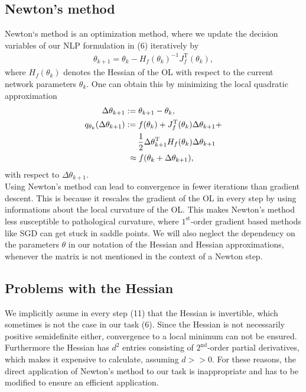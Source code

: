\documentclass[conference]{IEEEtran}
\begin{document}
	\subsection{Newton's method}
	\noindent
	Newton`s method is an optimization method, where we update the decision variables of our NLP formulation in (6) iteratively by
	\begin{align}
	\theta_{k+1} = \theta_{k} -H_{f}(\theta_{k})^{-1} J_{f}^{\mathrm{T}}(\theta_{k}),
	\end{align}
	where $H_{f}(\theta_{k})$ denotes the Hessian of the OL with respect to the current network parameters $\theta_{k}$. One can obtain this by minimizing the local quadratic approximation
	\begin{align}
	\text{ }\Delta\theta_{k+1} &:= \theta_{k+1} - \theta_{k},\\
	q_{\theta_{k}}(\Delta\theta_{k+1})&:= f(\theta_{k}) + J_{f}^{\mathrm{T}}(\theta_{k})\Delta\theta_{k+1} + \notag\\  
	&\:\:\:\:\:\:\:\frac{1}{2}\Delta\theta_{k+1}^{\mathrm{T}}H_{f}(\theta_{k})\Delta\theta_{k+1}\\
	&\text{ }\approx f(\theta_{k} + \Delta\theta_{k+1}),
	\end{align}
	with respect to $\Delta\theta_{k+1}$. \\
	Using Newton's method can lead to convergence in fewer iterations than gradient descent. This is because it rescales the gradient of the OL in every step by using informations about the local curvature of the OL. This makes Newton's method less susceptible to pathological curvature, where $1^{\text{st}}$-order gradient based methods like SGD can get stuck in saddle points. We will also neglect the dependency on the parameters $\theta$ in our notation of the Hessian and Hessian approximations, whenever the matrix is not mentioned in the context of a Newton step.
	
	
	\subsection{Problems with the Hessian}
	\noindent
	We implicitly asume in every step (11) that the Hessian is invertible, which sometimes is not the case in our task (6). Since the Hessian is not necessarily positive semidefinite either, convergence to a local minimum can not be ensured. Furthermore the Hessian has $d^{2}$ entries consisting of $2^{\text{nd}}$-order partial derivatives, which makes it expensive to calculate, assuming $d>>0$. For these reasons, the direct application of Newton's method to our task is inappropriate and has to be modified to ensure an efficient application.
	
\end{document}

